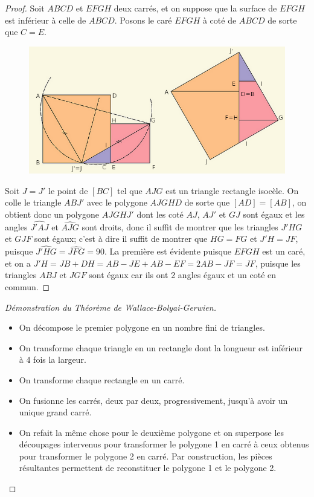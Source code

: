 \begin{proof}
  \hfill

  \noindent
  Soit $ABCD$ et $EFGH$ deux carrés, et on suppose que la surface de $EFGH$ est inférieur à celle de $ABCD$. Posons le caré $EFGH$ à coté de $ABCD$ de sorte que $C=E$.
  \newpage
  \begin{figure}[h]
      \centering
      \includegraphics[scale=0.6]{images/xx4.png}

  \end{figure}

\noindent
Soit $J=J'$ le point de $[BC]$ tel que $AJG$ est un triangle rectangle isocèle. On colle le triangle $ABJ'$ avec le polygone $AJGHD$ de sorte que $[AD] = [AB]$, on obtient donc un polygone  $AJGHJ'$ dont les coté $AJ$, $AJ'$ et $GJ$ sont égaux et les angles $\widehat{J'AJ}$ et $\widehat{AJG}$ sont droits, donc il suffit de montrer que les triangles $J'HG$ et $GJF$ sont égaux; c'est à dire il suffit de montrer que $HG=FG$ et $J'H=JF$, puisque $\widehat{J'HG} =\widehat{JFG}=90$. La première est évidente puisque $EFGH$ est un caré, et on a $J'H=JB+DH=AB-JE+AB-EF = 2AB-JF = JF$, puisque les triangles $ABJ$ et $JGF$ sont égaux car ils ont 2 angles égaux et un coté en commun.

\end{proof}
\begin{proof}[Démonstration du Théorème de Wallace-Bolyai-Gerwien]
  \hfill
  \begin{itemize}
    \item On décompose le premier polygone en un nombre fini de triangles.
    \item On transforme chaque triangle en un rectangle dont la longueur est inférieur à 4 fois la largeur.
    \item On transforme chaque rectangle en un carré.
    \item On fusionne les carrés, deux par deux, progressivement, jusqu'à avoir un unique grand carré.
    \item On refait la même chose pour le deuxième polygone et on superpose les découpages intervenus pour transformer le polygone 1 en carré à ceux obtenus pour transformer le polygone 2 en carré. Par construction, les pièces résultantes permettent de reconstituer le polygone 1 et le polygone 2.


  \end{itemize}
\end{proof}
